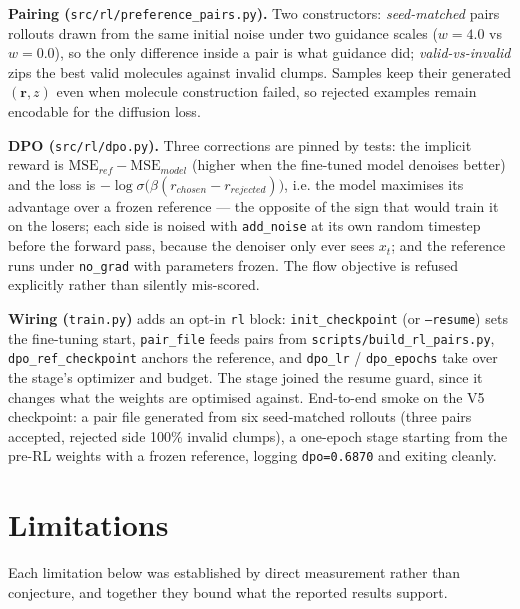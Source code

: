 \documentclass[12pt, a4paper]{article}
\begin{document}
\textbf{Pairing (}\texttt{src/rl/preference\_pairs.py}\textbf{).} Two
constructors: \emph{seed-matched} pairs rollouts drawn from the same initial
noise under two guidance scales ($w = 4.0$ vs $w = 0.0$), so the only
difference inside a pair is what guidance did; \emph{valid-vs-invalid} zips the
best valid molecules against invalid clumps. Samples keep their generated
$(\mathbf{r}, z)$ even when molecule construction failed, so rejected examples
remain encodable for the diffusion loss.

\textbf{DPO (}\texttt{src/rl/dpo.py}\textbf{).} Three corrections are pinned
by tests: the implicit reward is
$\mathrm{MSE}_{ref} - \mathrm{MSE}_{model}$ (higher when the fine-tuned model
denoises better) and the loss is $-\log\sigma\big(\beta(r_{chosen} -
r_{rejected})\big)$, i.e. the model maximises its advantage over a frozen
reference --- the opposite of the sign that would train it on the losers; each
side is noised with \texttt{add\_noise} at its own random timestep before the
forward pass, because the denoiser only ever sees $x_t$; and the reference runs
under \texttt{no\_grad} with parameters frozen. The flow objective is refused
explicitly rather than silently mis-scored.

\textbf{Wiring (}\texttt{train.py}\textbf{)} adds an opt-in \texttt{rl}
block: \texttt{init\_checkpoint} (or \texttt{--resume}) sets the fine-tuning
start, \texttt{pair\_file} feeds pairs from \texttt{scripts/build\_rl\_pairs.py},
\texttt{dpo\_ref\_checkpoint} anchors the reference, and \texttt{dpo\_lr} /
\texttt{dpo\_epochs} take over the stage's optimizer and budget. The stage
joined the resume guard, since it changes what the weights are optimised
against. End-to-end smoke on the V5 checkpoint: a pair file generated from six
seed-matched rollouts (three pairs accepted, rejected side 100\% invalid
clumps), a one-epoch stage starting from the pre-RL weights with a frozen
reference, logging \texttt{dpo=0.6870} and exiting cleanly.

\section{Limitations}
\label{sec:limitations}

Each limitation below was established by direct measurement rather than
conjecture, and together they bound what the reported results support.
\end{document}
